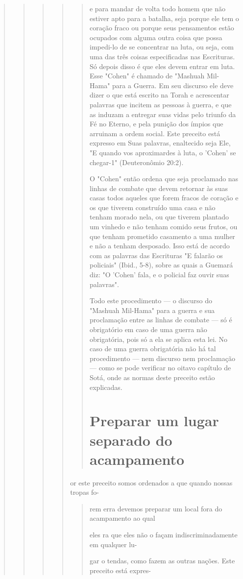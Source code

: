 \begin{quote}
\begin{quote}
\begin{quote}
\begin{quote}
\begin{quote}e para mandar de volta todo homem que não estiver apto para a batalha,
seja porque ele tem o coração fraco ou porque seus pensamentos estão
ocupados com alguma outra coisa que possa impedi-lo de se concentrar na
luta, ou seja, com uma das três coisas especificadas nas Escrituras. Só
depois disso é que eles devem entrar em luta. Esse "Cohen" é chamado de
"Mashuah Mil-Hama" para a Guerra. Em seu discurso ele deve dizer o que
está escrito na Torah e acres­centar palavras que incitem as pessoas à
guerra, e que as induzam a entregar suas vidas pelo triunfo da Fé no
Eterno, e pela punição dos ímpios que arrui­nam a ordem social. Este
preceito está expresso em Suas palavras, enaltecido seja Ele, "E quando
vos aproximardes à luta, o 'Cohen' se chegar-1" (Deutero­nômio 20:2).

O "Cohen" então ordena que seja proclamado nas linhas de comba­te que
devem retornar às suas casas todos aqueles que forem fracos de coração e
os que tiverem construído uma casa e não tenham morado nela, ou que
tive­rem plantado um vinhedo e não tenham comido seus frutos, ou que
tenham prometido casamento a uma mulher e não a tenham desposado. Isso
está de acordo com as palavras das Escrituras "E falarão os policiais"
(Ibid., 5-8), sobre as quais a Guemará diz: "O 'Cohen' fala, e o
policial faz ouvir suas palavras".

Todo este procedimento --- o discurso do "Mashuah Mil-Hama" pa­ra a
guerra e sua proclamação entre as linhas de combate --- só é obrigatório
em caso de uma guerra não obrigatória, pois só a ela se aplica esta lei.
No caso de uma guerra obrigatória não há tal procedimento --- nem
discurso nem pro­clamação --- como se pode verificar no oitavo capítulo
de Sotá, onde as nor­mas deste preceito estão explicadas.

\section{Preparar um lugar separado do acampamento}
\end{quote}

or este preceito somos ordenados a que quando nossas tropas fo-

\begin{quote}
rem erra devemos preparar um local fora do acampamento ao qual

eles ra que eles não o façam indiscriminadamente em qualquer lu-

gar o tendas, como fazem as outras nações. Este preceito está expres-


\end{quote}
\end{quote}
\end{quote}
\end{quote}
\end{quote}
